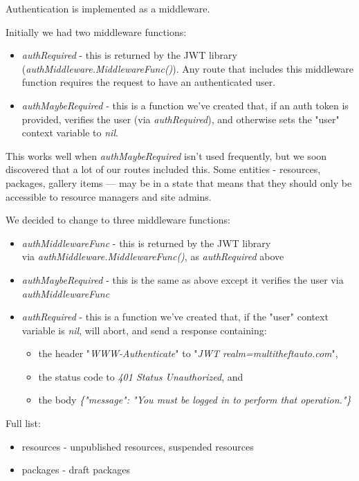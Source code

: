 \documentclass[bsc,frontabs,twoside,singlespacing,parskip,deptreport]{infthesis}     %
\begin{document}
Authentication is implemented as a middleware.

Initially we had two middleware functions:
\begin{itemize}
  \item \emph{authRequired} - this is returned by the JWT library \\ (\emph{authMiddleware.MiddlewareFunc()}). Any route that includes this middleware function requires the request to have an authenticated user.
  \item \emph{authMaybeRequired} - this is a function we've created that, if an auth token is provided, verifies the user (via \emph{authRequired}), and otherwise sets the "user" context variable to \emph{nil}.
\end{itemize}

This works well when \emph{authMaybeRequired} isn't used frequently, but we soon discovered that a lot of our routes included this. Some entities - resources, packages, gallery items — may be in a state that means that they should only be accessible to resource managers and site admins.

We decided to change to three middleware functions:
\begin{itemize}
  \item \emph{authMiddlewareFunc} - this is returned by the JWT library \\ via \emph{authMiddleware.MiddlewareFunc()}, as \emph{authRequired} above
  \item \emph{authMaybeRequired} - this is the same as above except it verifies the user via \emph{authMiddlewareFunc}
  \item \emph{authRequired} - this is a function we've created that, if the "user" context variable is \emph{nil}, will abort, and send a response containing:
   \begin{itemize}
     \item the header "\emph{WWW-Authenticate}" to "\emph{JWT realm=multitheftauto.com}",
     \item the status code to \emph{401 Status Unauthorized}, and
     \item the body \emph{\{"message": "You must be logged in to perform that operation."\}}
   \end{itemize}
\end{itemize}

Full list:

\begin{itemize}
  \item resources - unpublished resources, suspended resources
  \item packages - draft packages
\end{itemize}
\end{document}
